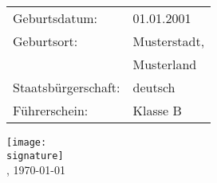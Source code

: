 \begin{sidebar}

  \displaySidebarPicture

  \displayJobDetails

  \begin{profile}
    \begin{tabular}{ll}
      Geburtsdatum:       & 01.01.2001   \\[3pt]
      Geburtsort:         & Musterstadt, \\[3pt]
                          & Musterland   \\[3pt]
      Staatsbürgerschaft: & deutsch      \\[3pt]
      Führerschein:       & Klasse B     \\[3pt]
    \end{tabular}
  \end{profile}
  \vspace{.5cm}
  \begin{contact}
  \end{contact}
  \vspace{.5cm}
  \begin{languages}
  \end{languages}

  \vspace{6.5cm}

  \texttt{[image: \\signature]}\\
  , \today
\end{sidebar}
